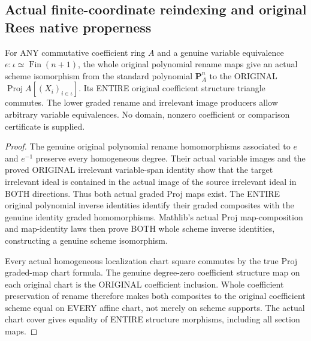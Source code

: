 \subsection{Actual finite-coordinate reindexing and original Rees native properness}

\begin{lemma}
\label{scheme:actual-polynomial-proj-reindexing}
\leanok
{}
For ANY commutative coefficient ring $A$ and a genuine variable equivalence
$e:\iota\simeq\operatorname{Fin}(n+1)$, the whole original polynomial rename maps
give an actual scheme isomorphism from the standard polynomial $\mathbf P^n_A$
to the ORIGINAL $\operatorname{Proj}A[(X_i)_{i\in\iota}]$. Its ENTIRE original
coefficient structure triangle commutes. The lower graded rename and irrelevant
image producers allow arbitrary variable equivalences. No domain, nonzero
coefficient or comparison certificate is supplied.
\end{lemma}
\begin{proof}
The genuine original polynomial rename homomorphisms associated to $e$ and
$e^{-1}$ preserve every homogeneous degree. Their actual variable images and
the proved ORIGINAL irrelevant variable-span identity show that the target
irrelevant ideal is contained in the actual image of the source irrelevant
ideal in BOTH directions. Thus both actual graded Proj maps exist.
The ENTIRE original polynomial inverse identities identify their graded
composites with the genuine identity graded homomorphisms. Mathlib's actual
Proj map-composition and map-identity laws then prove BOTH whole scheme
inverse identities, constructing a genuine scheme isomorphism.

Every actual homogeneous localization chart square commutes by the true
Proj graded-map chart formula. The genuine degree-zero coefficient structure
map on each original chart is the ORIGINAL coefficient inclusion. Whole
coefficient preservation of rename therefore makes both composites to the
original coefficient scheme equal on EVERY affine chart, not merely on
scheme supports. The actual chart cover gives equality of ENTIRE structure
morphisms, including all section maps.
\end{proof}

